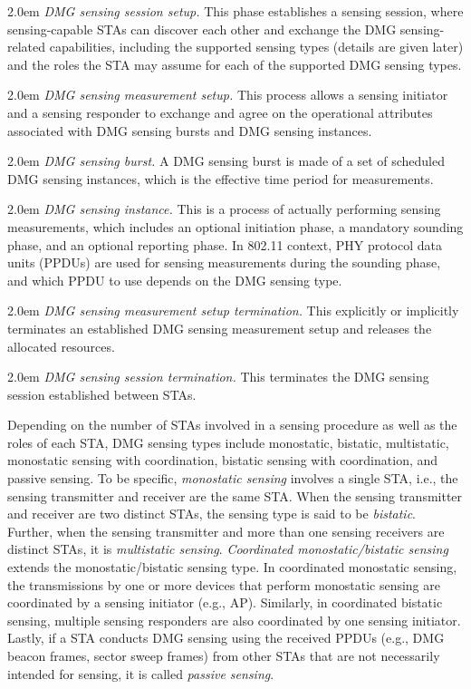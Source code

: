 \documentclass[journal,comsoc]{IEEEtran}
\begin{document}
\hangindent 2.0em
\checkmark \emph{DMG sensing session setup.} This phase establishes a sensing session, where sensing-capable STAs can discover each other and exchange the DMG sensing-related capabilities, including the supported sensing types (details are given later) and the roles the STA may assume for each of the supported DMG sensing types.

\hangindent 2.0em
\checkmark \emph{DMG sensing measurement setup.} This process allows a sensing initiator and a sensing responder to exchange and agree on the operational attributes associated with DMG sensing bursts and DMG sensing instances.

\hangindent 2.0em
\checkmark \emph{DMG sensing burst.} A DMG sensing burst is made of a set of scheduled DMG sensing instances, which is the effective time period for measurements.

\hangindent 2.0em
\checkmark \emph{DMG sensing instance.} This is a process of actually performing sensing measurements, which includes an optional initiation phase, a mandatory sounding phase, and an optional reporting phase. In 802.11 context, PHY protocol data units (PPDUs) are used for sensing measurements during the sounding phase, and which PPDU to use depends on the DMG sensing type.

\hangindent 2.0em
\checkmark \emph{DMG sensing measurement setup termination.} This explicitly or implicitly terminates an established DMG sensing measurement setup and releases the allocated resources.

\hangindent 2.0em
\checkmark \emph{DMG sensing session termination.} This terminates the DMG sensing session established between STAs.


Depending on the number of STAs involved in a sensing procedure as well as the roles of each STA, DMG sensing types include monostatic, bistatic, multistatic, monostatic sensing with coordination, bistatic sensing with coordination, and passive sensing. To be specific, \emph{monostatic sensing} involves a single STA, i.e., the sensing transmitter and receiver are the same STA. When the sensing transmitter and receiver are two distinct STAs, the sensing type is said to be \emph{bistatic}. Further, when the sensing transmitter and more than one sensing receivers are distinct STAs, it is \emph{multistatic sensing}. \emph{Coordinated monostatic/bistatic sensing} extends the monostatic/bistatic sensing type. In coordinated monostatic sensing, the transmissions by one or more devices that perform monostatic sensing are coordinated by a sensing initiator (e.g., AP). Similarly, in coordinated bistatic sensing, multiple sensing responders are also coordinated by one sensing initiator. Lastly, if a STA conducts DMG sensing using the received PPDUs (e.g., DMG beacon frames, sector sweep frames) from other STAs that are not necessarily intended for sensing, it is called \emph{passive sensing}.
\end{document}
